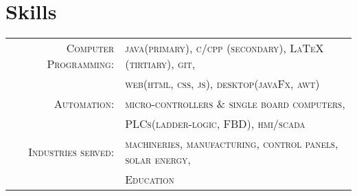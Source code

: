 \documentclass[a4paper]{article}
\begin{document}
\section{		Skills																													}
	\begin{tabular}{rl}	\small{}
	 	\small{}\textsc{		Computer Programming:	}	& \textsc{					java(primary), \small{c/cpp (secondary)}, LaTeX (tirtiary), git,			}	\\
  												& \textsc{					web(html, css, js), desktop(javaFx, awt)							} 	\\
 		\small{}\textsc{		Automation:			}	& \textsc{					micro-controllers \& single board computers,						}	\\
  												& \textsc{					PLCs(ladder-logic, FBD), hmi/scada								} 	\\
 		\small{}\textsc{		Industries served:		}	& \textsc{					machineries, manufacturing, control panels, solar energy,				}	\\
  												& \textsc{					Education													} 	\\
	\end{tabular}

\end{document}
